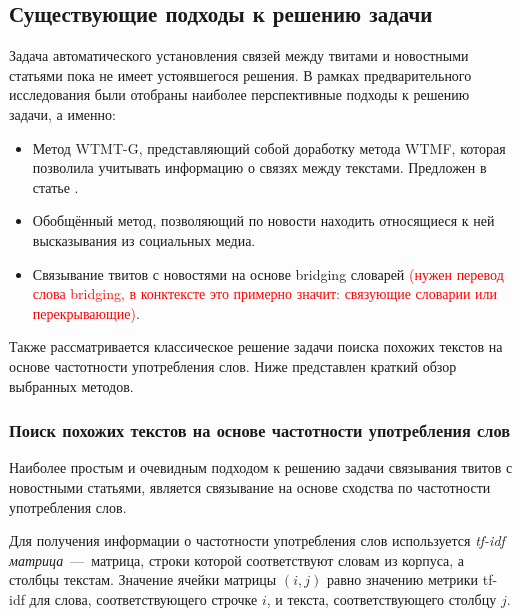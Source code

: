 \subsection{Существующие подходы к решению задачи}
    Задача автоматического установления связей между твитами и новостными статьями пока не имеет устоявшегося решения.
    В рамках предварительного исследования были отобраны наиболее перспективные подходы к решению задачи, а именно:
    \begin{itemize}
        \item Метод WTMT-G, представляющий собой доработку метода WTMF, которая позволила учитывать информацию о связях между текстами. Предложен в статье \cite{linking_base}.
        \item Обобщённый метод, позволяющий по новости находить относящиеся к ней высказывания из социальных медиа.
        \item Связывание твитов с новостями на основе bridging словарей
        \textcolor{red}{(нужен перевод слова bridging, в конктексте это примерно значит: связующие словарии или перекрывающие)}.
    \end{itemize}
    Также рассматривается классическое решение задачи поиска похожих текстов на основе частотности употребления слов.
    Ниже представлен краткий обзор выбранных методов.

    \subsubsection{Поиск похожих текстов на основе частотности употребления слов}
        Наиболее простым и очевидным подходом к решению задачи связывания твитов с новостными статьями, является связывание на основе сходства по частотности употребления слов.

        Для получения информации о частотности употребления слов используется \textit{tf-idf матрица}~---~матрица, строки которой соответствуют словам из корпуса, а столбцы текстам.
        Значение ячейки матрицы $(i,j)$ равно значению метрики tf-idf для слова, соответствующего строчке $i$, и текста, соответствующего столбцу $j$.

